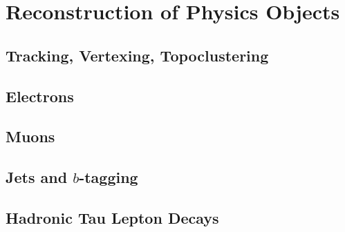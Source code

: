 \section{Reconstruction of Physics Objects}
\subsection{Tracking, Vertexing, Topoclustering}
\subsection{Electrons}
\subsection{Muons}
\subsection{Jets and $b$-tagging}

\subsection{Hadronic Tau Lepton Decays}


